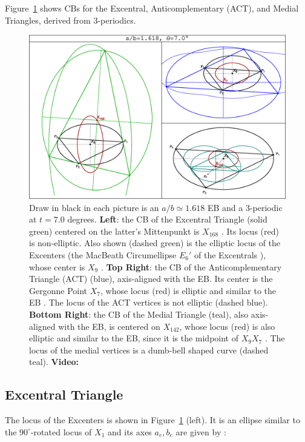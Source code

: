Figure~\ref{fig:cb_trio} shows CBs for the Excentral, Anticomplementary (ACT), and Medial Triangles, derived from 3-periodics.

\begin{figure}
    \centering
    \includegraphics[width=\textwidth]{pics_eps_new/0020_cb_trio.eps}
    \caption{Draw in black in each picture is an $a/b{\simeq}1.618$ EB and a 3-periodic at $t=7.0$ degrees. {\bf Left}: the CB of the Excentral Triangle (solid green) centered on the latter's Mittenpunkt is $X_{168}$ \cite{etc}. Its locus (red) is non-elliptic. Also shown (dashed green) is the elliptic locus of the Excenters (the MacBeath Circumellipse $E_6'$ of the Excentrals \cite{mw}), whose center is $X_9$ \cite{garcia2020-ellipses}. {\bf Top Right}: the CB of the Anticomplementary Triangle (ACT) (blue), axis-aligned with the EB. Its center is the Gergonne Point $X_7$, whose locus (red) is elliptic and similar to the EB \cite{garcia2020-ellipses}. The locus of the ACT vertices is not elliptic (dashed blue). {\bf Bottom Right}: the CB of the Medial Triangle (teal), also axis-aligned with the EB, is centered on $X_{142}$, whose locus (red) is also elliptic and similar to the EB, since it is the midpoint of $X_9X_7$ \cite{etc}. The locus of the medial vertices is a dumb-bell shaped curve (dashed teal). {\bf Video:} \cite[PL\#03]{reznik2020-playlist-circum}}
    \label{fig:cb_trio}
\end{figure}

\subsection{Excentral Triangle}
\label{sec:cb_exc}

The locus of the Excenters is shown in Figure~\ref{fig:cb_trio} (left). It is an ellipse similar to the $90^\circ$-rotated locus of $X_1$ and its axes $a_e,b_e$ are given by \cite{garcia2019-incenter,garcia2020-ellipses}:

